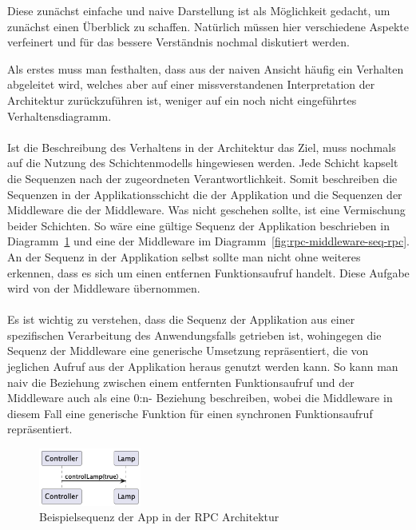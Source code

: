 Diese zunächst einfache und naive Darstellung ist als Möglichkeit gedacht, um zunächst einen Überblick zu schaffen. Natürlich müssen hier verschiedene Aspekte verfeinert und für das bessere Verständnis nochmal diskutiert werden. 

Als erstes muss man festhalten, dass aus der naiven Ansicht häufig ein Verhalten abgeleitet wird, welches aber auf einer missverstandenen Interpretation der Architektur zurückzuführen ist, weniger auf ein noch nicht eingeführtes Verhaltensdiagramm. 
\\\\
Ist die Beschreibung des Verhaltens in der Architektur das Ziel, muss nochmals auf die Nutzung des Schichtenmodells hingewiesen werden. Jede Schicht kapselt die Sequenzen nach der zugeordneten Verantwortlichkeit.
Somit beschreiben die Sequenzen in der Applikationsschicht die der Applikation und die Sequenzen der Middleware die der Middleware. Was nicht geschehen sollte, ist eine Vermischung beider Schichten. So wäre eine gültige Sequenz der Applikation beschrieben in Diagramm~\ref{fig:rpc-app-seq-rpc} und eine der Middleware im Diagramm~\ref{fig:rpc-middleware-seq-rpc}. An der Sequenz in der Applikation selbst sollte man nicht ohne weiteres erkennen, dass es sich um einen entfernen Funktionsaufruf handelt. Diese Aufgabe wird von der Middleware übernommen.
\\\\
Es ist wichtig zu verstehen, dass die Sequenz der Applikation aus einer spezifischen Verarbeitung des Anwendungsfalls getrieben ist, wohingegen die Sequenz der Middleware eine generische Umsetzung repräsentiert, die von jeglichen Aufruf aus der Applikation heraus genutzt werden kann. So kann man naiv die Beziehung zwischen einem entfernten Funktionsaufruf und der Middleware auch als eine 0:n- Beziehung beschreiben, wobei die Middleware  in diesem Fall eine generische Funktion für einen synchronen Funktionsaufruf repräsentiert. 


 \begin{figure}[!ht]
  \centering
  \includegraphics[width=0.30\textwidth]{fig/uml/rpc-app-seq.png}
  \caption{Beispielsequenz der App in der RPC Architektur}
  \label{fig:rpc-app-seq-rpc}
\end{figure}


